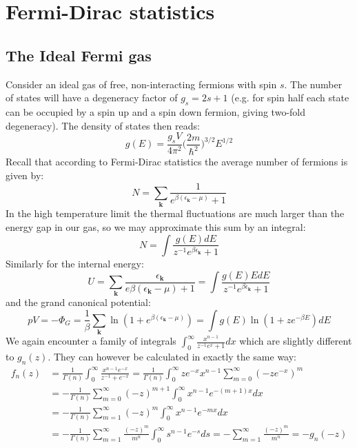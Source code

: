 \documentclass[a4paper,11pt,oneside]{book}
\begin{document}
\chapter{Fermi-Dirac statistics}
\section{The Ideal Fermi gas}
Consider an ideal gas of free, non-interacting fermions with spin $s$. The number of states will have a degeneracy factor of $g_s = 2s+1$ (e.g. for spin half each state can be occupied by a spin up and a spin down fermion, giving two-fold degeneracy). The density of states then reads:
\begin{equation}
    g(E) = \frac{g_sV}{4\pi^2} \bigg(\frac{2m}{\hbar^2}\bigg)^{3/2} E^{1/2}
\end{equation}
Recall that according to Fermi-Dirac statistics the average number of fermions is given by:
\begin{equation}
    N = \sum_\textbf{k} \frac{1}{e^{\beta(\epsilon_\textbf{k}-\mu)}+1}
\end{equation}
In the high temperature limit the thermal fluctuations are much larger than the energy gap in our gas, so we may approximate this sum by an integral:
\begin{equation}
    N = \int \frac{g(E) dE}{z^{-1}e^{\beta \epsilon_{\textbf{k}}}+1}
\end{equation}
Similarly for the internal energy:
\begin{equation}
    U =\sum_\textbf{k} \frac{\epsilon_{\textbf{k}}}{e{\beta(\epsilon_\textbf{k}-\mu)}+1} =\int \frac{g(E) E dE}{z^{-1}e^{\beta \epsilon_{\textbf{k}}}+1}
\end{equation}
and the grand canonical potential:
\begin{equation}
    pV = -\Phi_G = \frac{1}{\beta} \sum_\textbf{k} \ln(1+e^{\beta(\epsilon_{\textbf{k}}-\mu)}) = \int g(E) \ln(1+ze^{-\beta E}) dE
\end{equation}
We again encounter a family of integrals $\int_0^\infty \frac{x^{n-1}}{z^{-1}e^x+1} dx$ which are slightly different to $g_n(z)$. They can however be calculated in exactly the same way:
\begin{align}
    f_n(z) &= \frac{1}{\Gamma(n)} \int_0^\infty \frac{x^{n-1}e^{-x}}{z^{-1}+e^{-x}}=\frac{1}{\Gamma(n)}\int_0^\infty ze^{-x}x^{n-1} \sum_{m=0}^\infty (-ze^{-x})^m\\
    &=-\frac{1}{\Gamma(n)}\sum_{m=0}^\infty (-z)^{m+1}\int_0^\infty x^{n-1}e^{-(m+1)x}dx\\
    &=-\frac{1}{\Gamma(n)}\sum_{m=1}^\infty (-z)^{m}\int_0^\infty x^{n-1}e^{-mx}dx\\
    &=-\frac{1}{\Gamma(n)}\sum_{m=1}^\infty \frac{(-z)^{m}}{m^n}\int_0^\infty s^{n-1}e^{-s}ds =- \sum_{m=1}^\infty \frac{(-z)^{m}}{m^n} = -g_n(-z)
\end{align}
\end{document}

